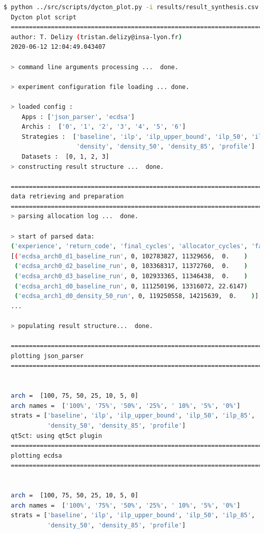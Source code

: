 \documentclass[10 pt]{article}
\begin{document}
\begin{lstlisting}[language=bash]
  $ python ../src/scripts/dycton_plot.py -i results/result_synthesis.csv
  Dycton plot script
  ================================================================================
  author: T. Delizy (tristan.delizy@insa-lyon.fr)
  2020-06-12 12:04:49.043407

  > command line arguments processing ...  done.

  > experiment configuration file loading ... done.

  > loaded config :
  	 Apps : ['json_parser', 'ecdsa']
  	 Archis :  ['0', '1', '2', '3', '4', '5', '6']
  	 Strategies :  ['baseline', 'ilp', 'ilp_upper_bound', 'ilp_50', 'ilp_85',
                    'density', 'density_50', 'density_85', 'profile']
  	 Datasets :  [0, 1, 2, 3]
  > constructing result structure ...  done.

  ================================================================================
  data retrieving and preparation
  ================================================================================
  > parsing allocation log ...  done.

  > start of parsed data:
  ('experience', 'return_code', 'final_cycles', 'allocator_cycles', 'fallback')
  [('ecdsa_arch0_d1_baseline_run', 0, 102783827, 11329656,  0.    )
   ('ecdsa_arch0_d2_baseline_run', 0, 103368317, 11372760,  0.    )
   ('ecdsa_arch0_d3_baseline_run', 0, 102933365, 11346438,  0.    )
   ('ecdsa_arch1_d0_baseline_run', 0, 111250196, 13316072, 22.6147)
   ('ecdsa_arch1_d0_density_50_run', 0, 119250558, 14215639,  0.    )]
  ...

  > populating result structure...  done.

  ================================================================================
  plotting json_parser
  ================================================================================


  arch =  [100, 75, 50, 25, 10, 5, 0]
  arch names =  ['100%', '75%', '50%', '25%', ' 10%', '5%', '0%']
  strats = ['baseline', 'ilp', 'ilp_upper_bound', 'ilp_50', 'ilp_85', 'density',
            'density_50', 'density_85', 'profile']
  qt5ct: using qt5ct plugin
  ================================================================================
  plotting ecdsa
  ================================================================================


  arch =  [100, 75, 50, 25, 10, 5, 0]
  arch names =  ['100%', '75%', '50%', '25%', ' 10%', '5%', '0%']
  strats = ['baseline', 'ilp', 'ilp_upper_bound', 'ilp_50', 'ilp_85', 'density',
            'density_50', 'density_85', 'profile']

\end{lstlisting}
\end{document}
